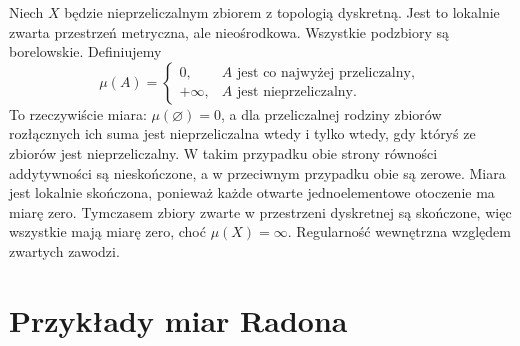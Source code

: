 \begin{przyklad}
\label{ex:nonradon-discrete-20}
Niech $X$ będzie nieprzeliczalnym zbiorem z topologią
dyskretną. Jest to lokalnie zwarta przestrzeń metryczna,
ale nieośrodkowa. Wszystkie podzbiory są borelowskie.
Definiujemy
\[
\mu(A)=\begin{cases}0,&A\text{ jest co najwyżej przeliczalny},\\
+\infty,&A\text{ jest nieprzeliczalny}.
\end{cases}
\]
To rzeczywiście miara: $\mu(\varnothing)=0$, a dla
przeliczalnej rodziny zbiorów rozłącznych ich suma jest
nieprzeliczalna wtedy i tylko wtedy, gdy któryś ze zbiorów
jest nieprzeliczalny. W takim przypadku obie strony
równości addytywności są nieskończone, a w przeciwnym
przypadku obie są zerowe.
Miara jest lokalnie skończona, ponieważ każde otwarte
jednoelementowe otoczenie ma miarę zero. Tymczasem
zbiory zwarte w przestrzeni dyskretnej są skończone,
więc wszystkie mają miarę zero, choć $\mu(X)=\infty$.
Regularność wewnętrzna względem zwartych zawodzi.
\end{przyklad}

\section{Przykłady miar Radona}

